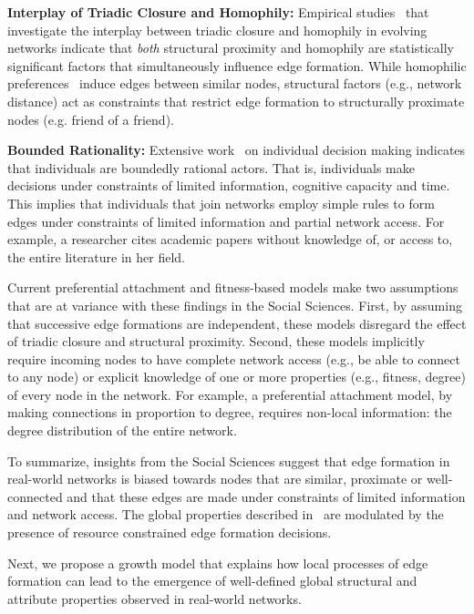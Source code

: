 \textbf{Interplay of Triadic Closure and Homophily:} Empirical studies~\cite{35626,block2014multidimensional} that investigate
the interplay between triadic closure and homophily in evolving networks
indicate that \textit{both} structural proximity and homophily are statistically
significant factors that simultaneously influence edge formation. While homophilic preferences~\cite{mcpherson2001birds} induce edges between similar nodes, structural factors (e.g., network distance) act as constraints that restrict edge formation to structurally proximate nodes (e.g. friend of a friend).

\textbf{Bounded Rationality:} Extensive work~\cite{simon1972theories,gigerenzer1996reasoning,lipman1995information}
on individual decision making indicates that individuals are boundedly
rational actors. That is, individuals make decisions under constraints of limited information, cognitive capacity and time. This implies that individuals that join networks employ simple rules to form edges under constraints of limited information and partial network access. For example, a researcher cites academic papers without knowledge of, or access
to, the entire literature in her field.

Current preferential attachment and fitness-based models
\cite{dorogovtsev2000structure,kim2017effect,singh2017relay,barabasi1999emergence} make two assumptions that are at variance with these findings in the Social Sciences. First, by assuming that successive edge formations are independent, these models disregard the effect of triadic closure and structural proximity. Second, these models implicitly require incoming nodes to have complete network access (e.g., be able to connect to any node) or explicit knowledge of one or more properties (e.g., fitness, degree) of every node in the network. For example, a preferential attachment model, by making connections in proportion to degree, requires non-local information: the degree distribution of the entire network.

To summarize, insights from the Social Sciences suggest that edge formation in real-world networks is biased towards nodes that are similar, proximate or well-connected and that
these edges are made under constraints of limited information and network access.
The global properties described in~ are modulated by the presence of
resource constrained edge formation decisions.

Next, we propose a growth model that explains how local processes of
edge formation can lead to the emergence of well-defined global structural and
attribute properties observed in real-world networks.


